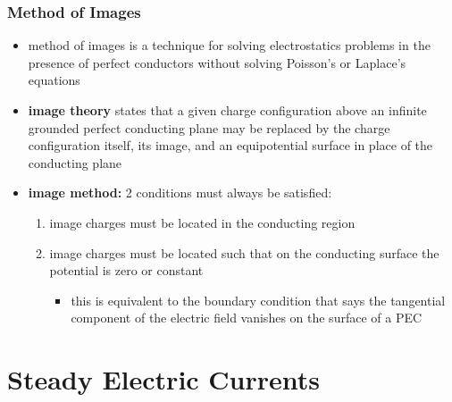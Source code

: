 \documentclass[10pt]{article}
\begin{document}
\section{Method of Images}
\begin{itemize}
    \item method of images is a technique for solving electrostatics problems in the presence of perfect conductors without solving Poisson's or Laplace's equations
    \item \textbf{image theory} states that a given charge configuration above an infinite grounded perfect conducting plane may be replaced by the charge configuration itself, its image, and an equipotential surface in place of the conducting plane
    \item \textbf{image method:} 2 conditions must always be satisfied:
        \begin{enumerate}
            \item image charges must be located in the conducting region
            \item image charges must be located such that on the conducting surface the potential is zero or constant 
                \begin{itemize}
                    \item this is equivalent to the boundary condition that says the tangential component of the electric field vanishes on the surface of a PEC
                \end{itemize}
        \end{enumerate}
\end{itemize}








\part{Steady Electric Currents}
\end{document}
